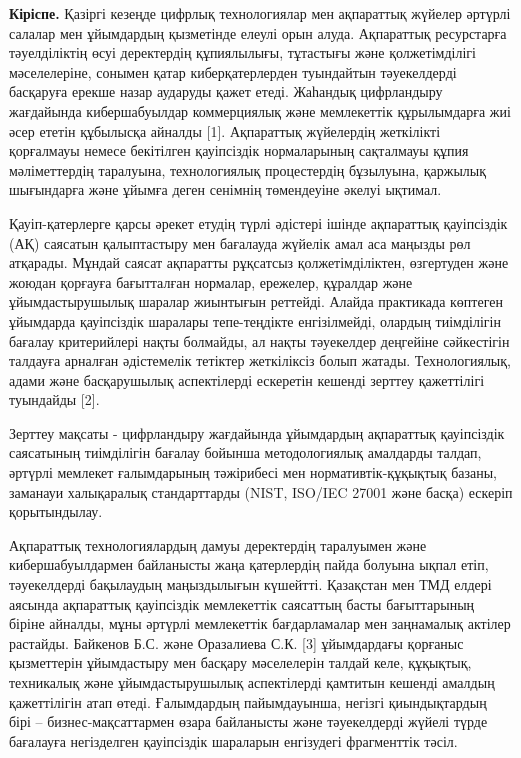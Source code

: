 {\bfseries Кіріспе.} Қазіргі кезеңде цифрлық технологиялар мен ақпараттық
жүйелер әртүрлі салалар мен ұйымдардың қызметінде елеулі орын алуда.
Ақпараттық ресурстарға тәуелділіктің өсуі деректердің құпиялылығы,
тұтастығы және қолжетімділігі мәселелеріне, сонымен қатар
киберқатерлерден туындайтын тәуекелдерді басқаруға ерекше назар аударуды
қажет етеді. Жаһандық цифрландыру жағдайында кибершабуылдар коммерциялық
және мемлекеттік құрылымдарға жиі әсер ететін құбылысқа айналды {[}1{]}.
Ақпараттық жүйелердің жеткілікті қорғалмауы немесе бекітілген
қауіпсіздік нормаларының сақталмауы құпия мәліметтердің таралуына,
технологиялық процестердің бұзылуына, қаржылық шығындарға және ұйымға
деген сенімнің төмендеуіне әкелуі ықтимал.

Қауіп-қатерлерге қарсы әрекет етудің түрлі әдістері ішінде ақпараттық
қауіпсіздік (АҚ) саясатын қалыптастыру мен бағалауда жүйелік амал аса
маңызды рөл атқарады. Мұндай саясат ақпаратты рұқсатсыз
қолжетімділіктен, өзгертуден және жоюдан қорғауға бағытталған нормалар,
ережелер, құралдар және ұйымдастырушылық шаралар жиынтығын реттейді.
Алайда практикада көптеген ұйымдарда қауіпсіздік шаралары тепе-теңдікте
енгізілмейді, олардың тиімділігін бағалау критерийлері нақты болмайды,
ал нақты тәуекелдер деңгейіне сәйкестігін талдауға арналған әдістемелік
тетіктер жеткіліксіз болып жатады. Технологиялық, адами және
басқарушылық аспектілерді ескеретін кешенді зерттеу қажеттілігі
туындайды {[}2{]}.

Зерттеу мақсаты - цифрландыру жағдайында ұйымдардың ақпараттық
қауіпсіздік саясатының тиімділігін бағалау бойынша методологиялық
амалдарды талдап, әртүрлі мемлекет ғалымдарының тәжірибесі мен
нормативтік-құқықтық базаны, заманауи халықаралық стандарттарды (NIST,
ISO/IEC 27001 және басқа) ескеріп қорытындылау.

Ақпараттық технологиялардың дамуы деректердің таралуымен және
кибершабуылдармен байланысты жаңа қатерлердің пайда болуына ықпал етіп,
тәуекелдерді бақылаудың маңыздылығын күшейтті. Қазақстан мен ТМД елдері
аясында ақпараттық қауіпсіздік мемлекеттік саясаттың басты бағыттарының
біріне айналды, мұны әртүрлі мемлекеттік бағдарламалар мен заңнамалық
актілер растайды. Байкенов Б.С. және Оразалиева С.К. {[}3{]} ұйымдардағы
қорғаныс қызметтерін ұйымдастыру мен басқару мәселелерін талдай келе,
құқықтық, техникалық және ұйымдастырушылық аспектілерді қамтитын кешенді
амалдың қажеттілігін атап өтеді. Ғалымдардың пайымдауынша, негізгі
қиындықтардың бірі -- бизнес-мақсаттармен өзара байланысты және
тәуекелдерді жүйелі түрде бағалауға негізделген қауіпсіздік шараларын
енгізудегі фрагменттік тәсіл.

